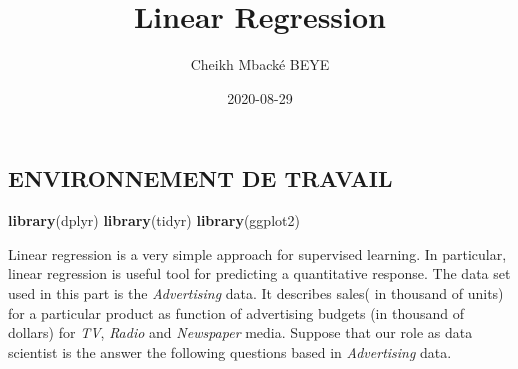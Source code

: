 \documentclass[
]{article}
\title{Linear Regression}
\author{Cheikh Mbacké BEYE}
\date{2020-08-29}
\newenvironment{Shaded}{\begin{snugshade}}{\end{snugshade}}
\newcommand{\KeywordTok}[1]{\textcolor[rgb]{0.13,0.29,0.53}{\textbf{#1}}}
\newcommand{\NormalTok}[1]{#1}
\begin{document}
\maketitle

{
\setcounter{tocdepth}{2}
\tableofcontents
}
\hypertarget{environnement-de-travail}{%
\subsection{ENVIRONNEMENT DE TRAVAIL}\label{environnement-de-travail}}

\begin{Shaded}
\begin{Highlighting}[]
\KeywordTok{library}\NormalTok{(dplyr)}
\KeywordTok{library}\NormalTok{(tidyr)}
\KeywordTok{library}\NormalTok{(ggplot2)}
\end{Highlighting}
\end{Shaded}

Linear regression is a very simple approach for supervised learning. In
particular, linear regression is useful tool for predicting a
quantitative response. The data set used in this part is the
\emph{Advertising} data. It describes sales( in thousand of units) for a
particular product as function of advertising budgets (in thousand of
dollars) for \emph{TV}, \emph{Radio} and \emph{Newspaper} media. Suppose
that our role as data scientist is the answer the following questions
based in \emph{Advertising} data.
\end{document}
